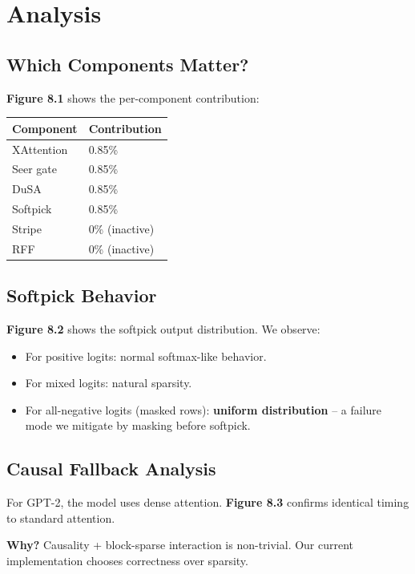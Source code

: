 \section{Analysis}

\subsection{Which Components Matter?}

\textbf{Figure 8.1} shows the per-component contribution:

\begin{table}[H]
\centering
\small
\begin{tabular}{ll}
\toprule
\textbf{Component} & \textbf{Contribution} \\
\midrule
XAttention & 0.85\% \\
Seer gate & 0.85\% \\
DuSA & 0.85\% \\
Softpick & 0.85\% \\
Stripe & 0\% (inactive) \\
RFF & 0\% (inactive) \\
\bottomrule
\end{tabular}
\end{table}

\subsection{Softpick Behavior}

\textbf{Figure 8.2} shows the softpick output distribution. We observe:

\begin{itemize}
\item For positive logits: normal softmax-like behavior.
\item For mixed logits: natural sparsity.
\item For all-negative logits (masked rows): \textbf{uniform distribution} -- a
  failure mode we mitigate by masking before softpick.

\end{itemize}
\subsection{Causal Fallback Analysis}

For GPT-2, the model uses dense attention. \textbf{Figure 8.3} confirms identical 
timing to standard attention.

\textbf{Why?} Causality + block-sparse interaction is non-trivial. Our current 
implementation chooses correctness over sparsity.

